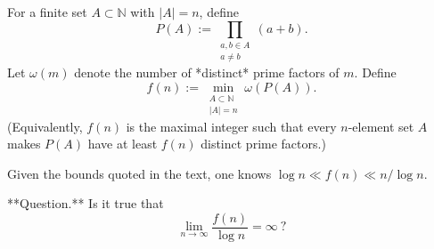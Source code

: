 For a finite set $A\subset \mathbb{N}$ with $|A|=n$, define
\[
P(A):=\prod_{\substack{a,b\in A\\ a\neq b}} (a+b).
\]
Let $\omega(m)$ denote the number of *distinct* prime factors of $m$.
Define
\[
f(n):=\min_{\substack{A\subset\mathbb{N}\\ |A|=n}} \omega(P(A)).
\]
(Equivalently, $f(n)$ is the maximal integer such that every $n$-element set $A$ makes $P(A)$ have at least $f(n)$ distinct prime factors.)

Given the bounds quoted in the text, one knows $\log n \ll f(n) \ll n/\log n$.

**Question.** Is it true that
\[
\lim_{n\to\infty} \frac{f(n)}{\log n} = \infty\ ?
\]
